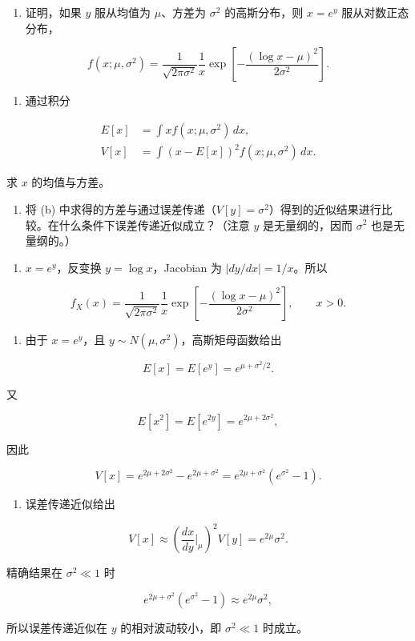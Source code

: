 \begin{question}
\begin{enumerate}
\item
  证明，如果 \(y\) 服从均值为 \(\mu\)、方差为 \(\sigma^2\)
  的高斯分布，则 \(x=e^y\) 服从对数正态分布，
\end{enumerate}

\[
f(x;\mu,\sigma^2)=\frac{1}{\sqrt{2\pi\sigma^2}}\frac{1}{x}\exp\left[-\frac{(\log x-\mu)^2}{2\sigma^2}\right].
\]

\begin{enumerate}[start=2]
\item
  通过积分
\end{enumerate}

\[
\begin{split}
E[x]&=\int x f(x;\mu,\sigma^2)\,dx,\\
V[x]&=\int (x-E[x])^2 f(x;\mu,\sigma^2)\,dx.
\end{split}
\]

求 \(x\) 的均值与方差。

\begin{enumerate}[start=3]
\item
  将 (b)
  中求得的方差与通过误差传递（\(V[y]=\sigma^2\)）得到的近似结果进行比较。在什么条件下误差传递近似成立？（注意
  \(y\) 是无量纲的，因而 \(\sigma^2\) 也是无量纲的。）
\end{enumerate}
\begin{solution}
\begin{enumerate}
\item
  \(x=e^y\)，反变换 \(y=\log x\)，Jacobian 为 \(|dy/dx|=1/x\)。所以
\end{enumerate}

\[
f_X(x)=\frac{1}{\sqrt{2\pi\sigma^2}}\frac1x
\exp\left[-\frac{(\log x-\mu)^2}{2\sigma^2}\right],\qquad x>0.
\]

\begin{enumerate}[start=2]
\item
  由于 \(x=e^y\)，且 \(y\sim N(\mu,\sigma^2)\)，高斯矩母函数给出
\end{enumerate}

\[
E[x]=E[e^y]=e^{\mu+\sigma^2/2}.
\]

又

\[
E[x^2]=E[e^{2y}]=e^{2\mu+2\sigma^2},
\]

因此

\[
V[x]=e^{2\mu+2\sigma^2}-e^{2\mu+\sigma^2}
=e^{2\mu+\sigma^2}(e^{\sigma^2}-1).
\]

\begin{enumerate}[start=3]
\item
  误差传递近似给出
\end{enumerate}

\[
V[x]\approx \left(\frac{dx}{dy}\bigg|_{\mu}\right)^2V[y]=e^{2\mu}\sigma^2.
\]

精确结果在 \(\sigma^2\ll1\) 时

\[
e^{2\mu+\sigma^2}(e^{\sigma^2}-1)
\approx e^{2\mu}\sigma^2,
\]

所以误差传递近似在 \(y\) 的相对波动较小，即 \(\sigma^2\ll1\) 时成立。
\end{solution}
\end{question}



